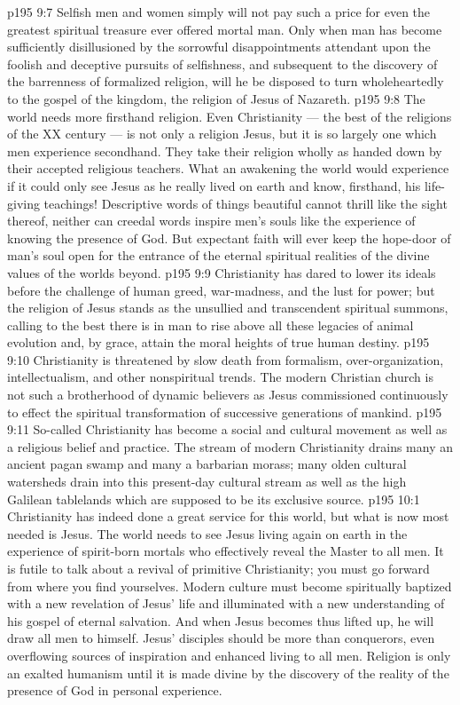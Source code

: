 \vs p195 9:7 Selfish men and women simply will not pay such a price for even the greatest spiritual treasure ever offered mortal man. Only when man has become sufficiently disillusioned by the sorrowful disappointments attendant upon the foolish and deceptive pursuits of selfishness, and subsequent to the discovery of the barrenness of formalized religion, will he be disposed to turn wholeheartedly to the gospel of the kingdom, the religion of Jesus of Nazareth.
\vs p195 9:8 The world needs more firsthand religion. Even Christianity --- the best of the religions of the XX century --- is not only a religion  Jesus, but it is so largely one which men experience secondhand. They take their religion wholly as handed down by their accepted religious teachers. What an awakening the world would experience if it could only see Jesus as he really lived on earth and know, firsthand, his life\hyp{}giving teachings! Descriptive words of things beautiful cannot thrill like the sight thereof, neither can creedal words inspire men’s souls like the experience of knowing the presence of God. But expectant faith will ever keep the hope\hyp{}door of man’s soul open for the entrance of the eternal spiritual realities of the divine values of the worlds beyond.
\vs p195 9:9 \pc Christianity has dared to lower its ideals before the challenge of human greed, war\hyp{}madness, and the lust for power; but the religion of Jesus stands as the unsullied and transcendent spiritual summons, calling to the best there is in man to rise above all these legacies of animal evolution and, by grace, attain the moral heights of true human destiny.
\vs p195 9:10 Christianity is threatened by slow death from formalism, over\hyp{}organization, intellectualism, and other nonspiritual trends. The modern Christian church is not such a brotherhood of dynamic believers as Jesus commissioned continuously to effect the spiritual transformation of successive generations of mankind.
\vs p195 9:11 So\hyp{}called Christianity has become a social and cultural movement as well as a religious belief and practice. The stream of modern Christianity drains many an ancient pagan swamp and many a barbarian morass; many olden cultural watersheds drain into this present\hyp{}day cultural stream as well as the high Galilean tablelands which are supposed to be its exclusive source.
\vs p195 10:1 Christianity has indeed done a great service for this world, but what is now most needed is Jesus. The world needs to see Jesus living again on earth in the experience of spirit\hyp{}born mortals who effectively reveal the Master to all men. It is futile to talk about a revival of primitive Christianity; you must go forward from where you find yourselves. Modern culture must become spiritually baptized with a new revelation of Jesus’ life and illuminated with a new understanding of his gospel of eternal salvation. And when Jesus becomes thus lifted up, he will draw all men to himself. Jesus’ disciples should be more than conquerors, even overflowing sources of inspiration and enhanced living to all men. Religion is only an exalted humanism until it is made divine by the discovery of the reality of the presence of God in personal experience.
